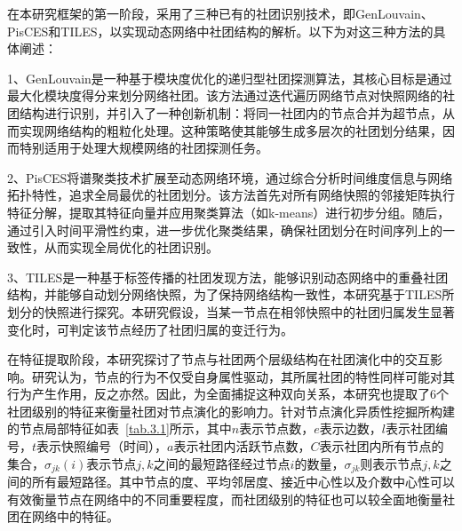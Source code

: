 在本研究框架的第一阶段，采用了三种已有的社团识别技术，即GenLouvain、PisCES和TILES，以实现动态网络中社团结构的解析。以下为对这三种方法的具体阐述：

1、GenLouvain是一种基于模块度优化的递归型社团探测算法，其核心目标是通过最大化模块度得分来划分网络社团。该方法通过迭代遍历网络节点对快照网络的社团结构进行识别，并引入了一种创新机制：将同一社团内的节点合并为超节点，从而实现网络结构的粗粒化处理。这种策略使其能够生成多层次的社团划分结果，因而特别适用于处理大规模网络的社团探测任务。

2、PisCES将谱聚类技术扩展至动态网络环境，通过综合分析时间维度信息与网络拓扑特性，追求全局最优的社团划分。该方法首先对所有网络快照的邻接矩阵执行特征分解，提取其特征向量并应用聚类算法（如k-means）进行初步分组。随后，通过引入时间平滑性约束，进一步优化聚类结果，确保社团划分在时间序列上的一致性，从而实现全局优化的社团识别。

3、TILES是一种基于标签传播的社团发现方法，能够识别动态网络中的重叠社团结构，并能够自动划分网络快照，为了保持网络结构一致性，本研究基于TILES所划分的快照进行探究。本研究假设，当某一节点在相邻快照中的社团归属发生显著变化时，可判定该节点经历了社团归属的变迁行为。




在特征提取阶段，本研究探讨了节点与社团两个层级结构在社团演化中的交互影响。研究认为，节点的行为不仅受自身属性驱动，其所属社团的特性同样可能对其行为产生作用，反之亦然。因此，为全面捕捉这种双向关系，本研究也提取了$6$个社团级别的特征来衡量社团对节点演化的影响力。针对节点演化异质性挖掘所构建的节点局部特征如表~\ref{tab.3.1}所示，其中$n$表示节点数，$e$表示边数，$l$表示社团编号，$t$表示快照编号（时间），$a$表示社团内活跃节点数，$C$表示社团内所有节点的集合，$\sigma_{jk}(i)$表示节点$j,k$之间的最短路径经过节点$i$的数量，$\sigma_{jk}$则表示节点$j,k$之间的所有最短路径。其中节点的度、平均邻居度、接近中心性以及介数中心性可以有效衡量节点在网络中的不同重要程度，而社团级别的特征也可以较全面地衡量社团在网络中的特征。

